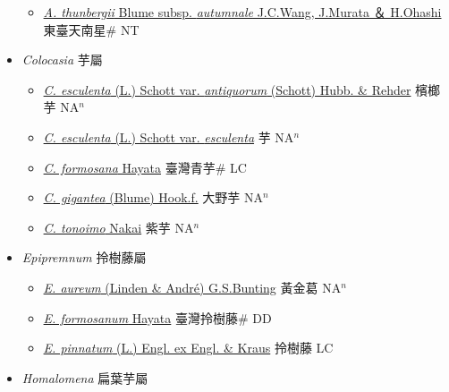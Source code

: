 \begin{itemize}
\begin{itemize}
        \item[] \href{http://www.theplantlist.org/tpl1.1/search?q=Arisaema+thunbergii+subsp.+autumnale}{\textit{A. thunbergii} Blume subsp. \textit{autumnale} J.C.Wang, J.Murata ＆ H.Ohashi}   東臺天南星\# NT
  \end{itemize}
 \item[] \textit{Colocasia} 芋屬
                    
  \begin{itemize}
        \item[] \href{http://www.theplantlist.org/tpl1.1/search?q=Colocasia+esculenta+var.+antiquorum}{\textit{C. esculenta} (L.) Schott var. \textit{antiquorum} (Schott) Hubb. \& Rehder}   檳榔芋 NA$^n$
        \item[] \href{http://www.theplantlist.org/tpl1.1/search?q=Colocasia+esculenta+var.+esculenta}{\textit{C. esculenta} (L.) Schott var. \textit{esculenta}}   芋 NA$^n$
        \item[] \href{http://www.theplantlist.org/tpl1.1/search?q=Colocasia+formosana}{\textit{C. formosana} Hayata}   臺灣青芋\# LC
        \item[] \href{http://www.theplantlist.org/tpl1.1/search?q=Colocasia+gigantea}{\textit{C. gigantea} (Blume) Hook.f.}   大野芋 NA$^n$
        \item[] \href{http://www.theplantlist.org/tpl1.1/search?q=Colocasia+tonoimo}{\textit{C. tonoimo} Nakai}   紫芋 NA$^n$
  \end{itemize}
 \item[] \textit{Epipremnum} 拎樹藤屬
                    
  \begin{itemize}
        \item[] \href{http://www.theplantlist.org/tpl1.1/search?q=Epipremnum+aureum}{\textit{E. aureum} (Linden \& André) G.S.Bunting}   黃金葛 NA$^n$
        \item[] \href{http://www.theplantlist.org/tpl1.1/search?q=Epipremnum+formosanum}{\textit{E. formosanum} Hayata}   臺灣拎樹藤\# DD
        \item[] \href{http://www.theplantlist.org/tpl1.1/search?q=Epipremnum+pinnatum}{\textit{E. pinnatum} (L.) Engl. ex Engl. \& Kraus}   拎樹藤 LC
  \end{itemize}
 \item[] \textit{Homalomena} 扁葉芋屬
                    

\end{itemize}
